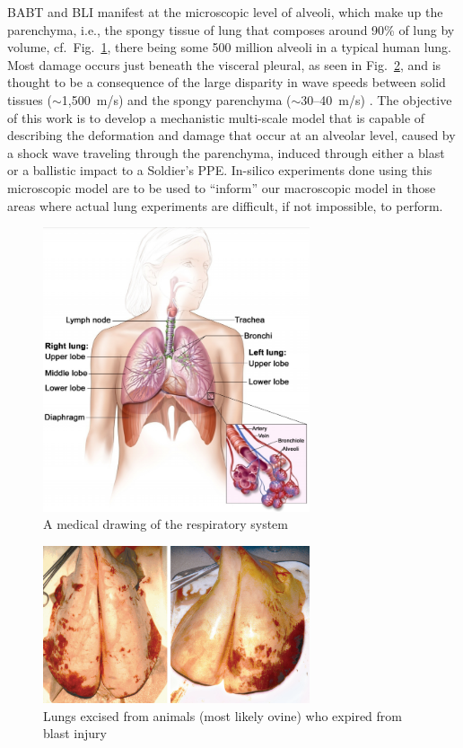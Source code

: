 BABT and BLI manifest at the microscopic level of alveoli, which make up the parenchyma, i.e., the spongy tissue of lung that composes around 90\% of lung by volume, cf.\ Fig.~\ref{figLungDrawing}, there being some 500 million alveoli in a typical human lung.  Most damage occurs just beneath the visceral pleural, as seen in Fig.~\ref{figDamagedLung}, and is thought to be a consequence of the large disparity in wave speeds between solid tissues ($\sim$1,500~m/s) and the spongy parenchyma ($\sim$30--40~m/s) \cite{Stuhmiller08}.  The objective of this work is to develop a mechanistic multi-scale model that is capable of describing the deformation and damage that occur at an alveolar level, caused by a shock wave traveling through the parenchyma, induced through either a blast or a ballistic impact to a Soldier's PPE.  In-silico experiments done using this microscopic model are to be used to ``inform'' our macroscopic model in those areas where actual lung experiments are difficult, if not impossible, to perform.

\begin{figure}
    \centering
    \includegraphics[width=0.7\textwidth]{figures/theRespiratorySystem.png}
    \caption{A medical drawing of the respiratory system \cite{Josey10}}
    \label{figLungDrawing}
\end{figure}

\begin{figure}
    \centering
    \includegraphics[width=0.7\textwidth]{figures/lungInjuryResultingFromBlast.png}
    \caption{Lungs excised from animals (most likely ovine) who expired from blast injury \cite{Stuhmiller08}}
    \label{figDamagedLung}
\end{figure} 

